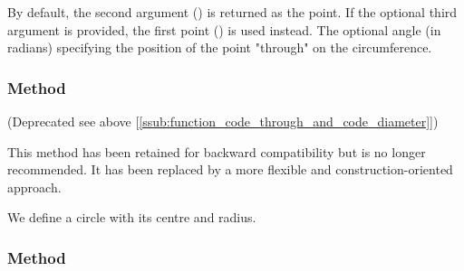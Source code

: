 By default, the second argument () is returned as the  point. If the optional third argument  is provided, the first point () is used instead. The optional angle (in radians) specifying the position of the point "through" on the circumference.

\vspace{1em}

\begin{tkzexample}[latex=6cm]
\end{tkzexample}

\subsubsection{Method }
\label{ssub:method_circle_radius}

(Deprecated see above [\ref{ssub:function_code_through_and_code_diameter}])

This method has been retained for backward compatibility but is no longer recommended. It has been replaced by a more flexible and construction-oriented approach.

We define a circle with its centre and radius.

\vspace{1em}
\begin{tkzexample}[latex=.5\textwidth]
\begin{center}
\end{center}
\end{tkzexample}

\subsubsection{Method }
\label{ssub:method_circle_diameter}

